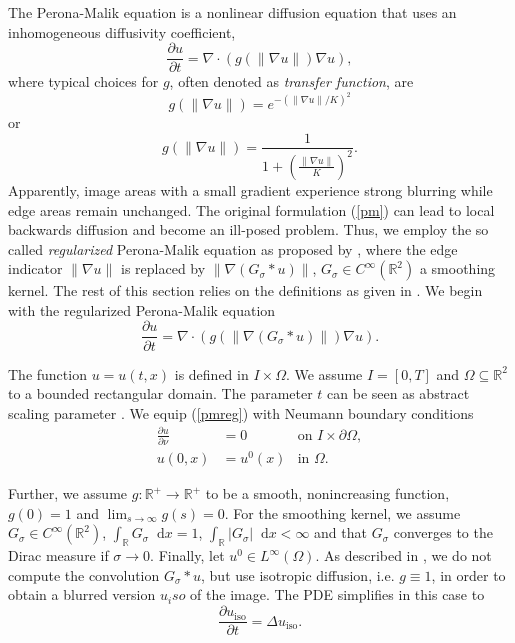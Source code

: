 \documentclass{report}
\renewcommand*\d{\mathop{}\!\mathrm{d}}
\def\ssq{\subseteq}
\def\R{\mathbb{R}}
\def\iso{\text{iso}}
\begin{document}
The Perona-Malik equation \citep{perona1990} is a nonlinear diffusion equation that uses an inhomogeneous diffusivity coefficient,
\begin{equation} \label{pm}
	\frac{\partial u}{\partial t} = \nabla \cdot \left( g(\|\nabla u\|) \nabla u \right),
\end{equation}
where typical choices for $g$, often denoted as \emph{transfer function}, are
\begin{equation}
	g(\|\nabla u\|) = e^{-(\|\nabla u\|/K)^2}
\end{equation}
or
\begin{equation}
	g(\|\nabla u\|) = \frac{1}{1 + \left( \frac{\|\nabla u\|}{K}\right)^2}.
\end{equation}
Apparently, image areas with a small gradient experience strong blurring while edge areas remain unchanged. The original formulation (\ref{pm}) can lead to local backwards diffusion and become an ill-posed problem. Thus, we employ the so called \emph{regularized} Perona-Malik equation as proposed by \cite{catte1992}, where the edge indicator $\|\nabla u\|$ is replaced by $\|\nabla (G_\sigma \ast u)\|$, $G_\sigma \in C^\infty(\R^2)$ a smoothing kernel. The rest of this section relies on the definitions as given in \cite{handlovicova2002}. We begin with the regularized Perona-Malik equation
\begin{equation} \label{pmreg}
    \frac{\partial u}{\partial t} = \nabla \cdot \left( g\left(\left\|\nabla (G_{\sigma} \ast u)\right\|\right) \nabla u \right).
\end{equation}

The function $u = u(t,x)$ is defined in $I \times \Omega$. We assume $I = [0, T]$ and $\Omega \ssq \R^2$ to a bounded rectangular domain. The parameter $t$ can be seen as abstract scaling parameter \citep[p. 219]{handlovicova2002}. We equip (\ref{pmreg}) with Neumann boundary conditions
\begin{align}
	\frac{\partial u}{\partial \nu} &= 0 & \text{on } I \times \partial \Omega, \\
	u(0,x) &= {u^0}(x) & \text{in } \Omega.
\end{align}

Further, we assume $g: \R^+ \rightarrow \R^+$ to be a smooth, nonincreasing function, $g(0)=1$ and $\lim_{s \rightarrow \infty} g(s) = 0$. For the smoothing kernel, we assume $G_\sigma \in C^\infty(\R^2)$, $\int_\R G_\sigma \d x = 1$, $\int_\R |G_\sigma| \d x < \infty$ and that $G_\sigma$ converges to the Dirac measure if $\sigma \to 0$. Finally, let $u^0 \in L^\infty(\Omega)$. As described in \cite{handlovicova2002}, we do not compute the convolution $G_{\sigma} \ast u$, but use isotropic diffusion, i.e. $g \equiv 1$, in order to obtain a blurred version $u_iso$ of the image. The PDE simplifies in this case to
\begin{equation} \label{pmiso}
	\frac{\partial u_\iso}{\partial t} = \Delta u_\iso.
\end{equation}
\end{document}
